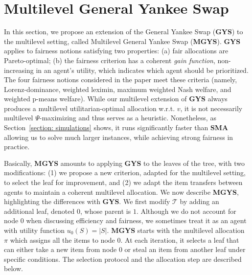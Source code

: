 \documentclass[]{article}
\newcommand{\tree}{\mathcal{T}}
\begin{document}
\section{Multilevel General Yankee Swap} \label{section: mgys}

In this section, we propose an extension of the General Yankee Swap (\textbf{GYS}) \cite{Viswanathan_Zick2023b} to the multilevel setting, called Multilevel General Yankee Swap ({\bf MGYS}). \textbf{GYS} applies to fairness notions satisfying two properties: (a) fair allocations are Pareto-optimal; (b) the fairness criterion has a coherent \emph{gain function}, non-increasing in an agent's utility, which indicates which agent should be prioritized. The four fairness notions considered in the paper meet these criteria (namely, Lorenz-dominance, weighted leximin, maximum weighted Nash welfare, and weighted p-means welfare). 
While our multilevel extension of \textbf{GYS} always produces a multilevel utilitarian-optimal allocation w.r.t. $v$, it is not necessarily multilevel $\Psi$-maximizing and thus serves as a heuristic. 
Nonetheless, as Section~\ref{section: simulations} shows, it runs significantly faster than {\bf SMA} allowing us to solve much larger instances, while achieving strong fairness in practice. 

\medskip

Basically, {\bf MGYS} amounts to applying {\bf GYS} to the leaves of the tree, with two modifications: (1) we propose a new criterion, adapted for the multilevel setting, to select the leaf for improvement, and (2) we adapt the item transfers between agents to maintain a coherent multilevel allocation. We now describe \textbf{MGYS}, highlighting the differences with \textbf{GYS}.
We first modify $\tree$ by adding an additional leaf, denoted $0$, whose parent is $1$. Although we do not account for  node $0$ when discussing efficiency and fairness, we sometimes treat it as an agent with utility function $u_0(S) = |S|$. {\bf MGYS} starts with the multilevel allocation $\pi $ which assigns all the items to node $0$. At each iteration, it selects a leaf that can either take a new item from node $0$ or steal an item from another leaf under specific conditions. The selection protocol and the allocation step are described below.

\medskip
\end{document}
